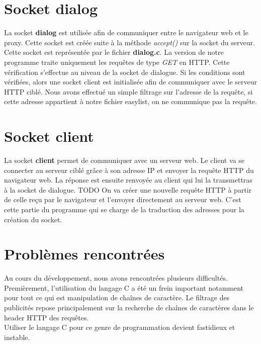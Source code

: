 \documentclass[a4paper,11pt, oneside]{book}
\def\todo{{\color{red}\Huge{TODO}}}
\begin{document}
		\section{Socket dialog}

			La socket \textbf{dialog} est utilisée afin de communiquer entre le navigateur web et le proxy. Cette socket est créée
			suite à la méthode \textit{accept()} sur la socket du serveur. Cette socket est représentée par le fichier \textbf{dialog.c}.
			La version de notre programme traite uniquement les requêtes de type \textit{GET} en HTTP. Cette vérification s'effectue au niveau de la socket
			de dialogue. Si les conditions sont vérifiées, alors une socket client est initialisée afin de communiquer avec le serveur HTTP ciblé.
			Nous avons effectué un simple filtrage sur l'adresse de la requête, si cette adresse appartient à notre fichier easylist, on ne communique
			pas la requête.

		\section{Socket client}

			La socket \textbf{client} permet de communiquer avec un serveur web. Le client va se connecter au serveur ciblé grâce à son adresse IP
			et envoyer la requête HTTP du navigateur web. La réponse est ensuite renvoyée
			au client qui lui la transmettras à la socket de dialogue.
			\todo
			On va créer une nouvelle requête HTTP à partir de celle reçu par le navigateur et l'envoyer directement au serveur web.
			C'est cette partie du programme qui se charge de la traduction des adresses pour la création du socket.

		\section{Problèmes rencontrées}

			Au cours du développement, nous avons rencontrées plusieurs difficultés.
			Premièrement, l'utilisation du langage C a été un frein important notamment pour tout ce qui est
			manipulation de chaînes de caractère.
			Le filtrage des publicités repose principalement sur la recherche de chaînes de caractères dans le header HTTP des requêtes.\\
			Utiliser le langage C pour ce genre de programmation devient fastidieux et instable.
\end{document}
